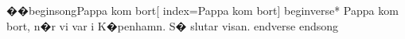 ��\ b e g i n s o n g { P a p p a   k o m   b o r t } [   	 	 	 	 	 	 	 	 	 i n d e x = { P a p p a   k o m   b o r t } ] 	 	 
 
 	 
 
 \ b e g i n v e r s e * 	 	 	 	 	 	 
 
 P a p p a   k o m   b o r t ,   
 
 n � r   v i   v a r   i   K � p e n h a m n . 
 
 S �   s l u t a r   v i s a n . 
 
 \ e n d v e r s e 	 	 	 	 	 	 	 	 	 	 
 
 \ e n d s o n g 	 	 
 
 